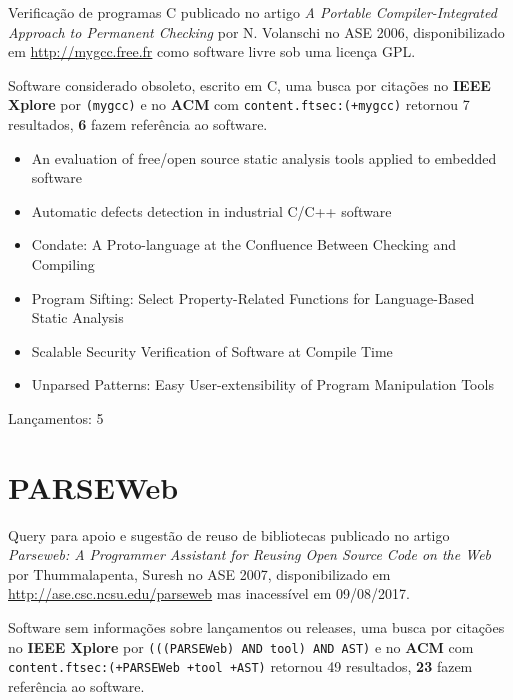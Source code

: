 Verificação de programas C
publicado no artigo {\it A Portable Compiler-Integrated Approach to Permanent Checking}
por N. Volanschi
no ASE 2006,
disponibilizado em \url{http://mygcc.free.fr}
como software livre
sob uma licença GPL.

Software considerado obsoleto,
escrito em C,
uma busca por citações no {\bf IEEE Xplore} por
\texttt{(mygcc)}
e no {\bf ACM} com
\texttt{content.ftsec:(+mygcc)}
retornou
7 resultados,
{\bf 6} fazem referência ao software.

\begin{itemize}
\item An evaluation of free/open source static analysis tools applied to embedded software
\item Automatic defects detection in industrial C/C++ software
\item Condate: A Proto-language at the Confluence Between Checking and Compiling
\item Program Sifting: Select Property-Related Functions for Language-Based Static Analysis
\item Scalable Security Verification of Software at Compile Time
\item Unparsed Patterns: Easy User-extensibility of Program Manipulation Tools
\end{itemize}

Lançamentos: 5

\section{PARSEWeb}

Query para apoio e sugestão de reuso de bibliotecas
publicado no artigo {\it Parseweb: A Programmer Assistant for Reusing Open Source Code on the Web}
por Thummalapenta, Suresh
no ASE 2007,
disponibilizado em \url{http://ase.csc.ncsu.edu/parseweb}
mas inacessível em 09/08/2017.

Software sem informações sobre lançamentos ou releases,
uma busca por citações no {\bf IEEE Xplore} por
\texttt{(((PARSEWeb) AND tool) AND AST)}
e no {\bf ACM} com
\texttt{content.ftsec:(+PARSEWeb +tool +AST)}
retornou
49 resultados,
{\bf 23} fazem referência ao software.

